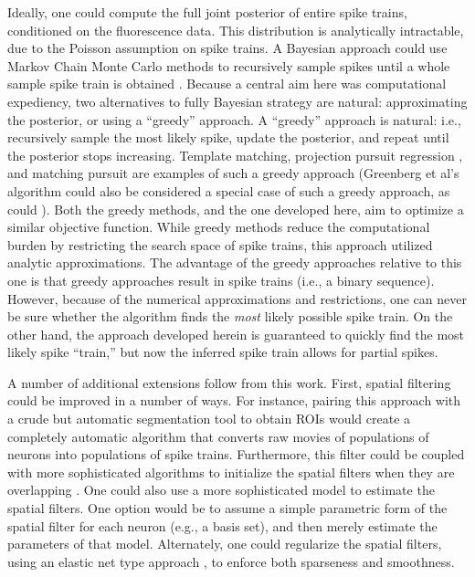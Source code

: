 Ideally, one could compute the full joint posterior of entire spike trains, conditioned on the fluorescence data.  This distribution is analytically intractable, due to the Poisson assumption on spike trains.  A Bayesian approach could use Markov Chain Monte Carlo methods to recursively sample spikes until a whole sample spike train is obtained \cite{AndrieuDoucet01,MishchenkoPaninski09,JouclaPouzat10}.  Because a central aim here was computational expediency, two alternatives to fully Bayesian strategy are natural: approximating the posterior, or using a ``greedy'' approach. A ``greedy'' approach is natural: i.e.,  recursively sample the most likely spike, update the posterior, and repeat until the posterior stops increasing.  Template matching, projection pursuit regression \cite{FS81}, and matching pursuit \cite{MallatZhang93} are examples of such a greedy approach (Greenberg et al's algorithm \cite{GreenbergKerr08} could also be considered a special case of such a greedy approach, as could \cite{GreweHelmchen10}).  Both the greedy methods, and the one developed here, aim to optimize a similar objective function.  While greedy methods reduce the computational burden by restricting the search space of spike trains, this approach utilized analytic approximations.  The advantage of the greedy approaches relative to this one is that greedy approaches result in spike trains (i.e., a binary sequence).  However, because of the numerical approximations and restrictions, one can never be sure whether the algorithm finds the \emph{most} likely possible spike train.  On the other hand, the approach developed herein is guaranteed to quickly find the most likely spike ``train,'' but now the inferred spike train allows for partial spikes.  

A number of additional extensions follow from this work.  First, spatial filtering could be improved in a number of ways.  For instance, pairing this approach with a crude but automatic segmentation tool to obtain ROIs would create a completely automatic algorithm that converts raw movies of populations of neurons into populations of spike trains.  Furthermore, this filter could be coupled with more sophisticated algorithms to initialize the spatial filters when they are overlapping \cite{MukamelSchnitzer09}. One could also use a more sophisticated model to estimate the spatial filters.  One option would be to assume a simple parametric form of the spatial filter for each neuron (e.g., a basis set), and then merely estimate the parameters of that model.  Alternately, one could regularize the spatial filters, using an elastic net type approach \cite{ZouHastie05,GrosenickSmith09}, to enforce both sparseness and smoothness.


